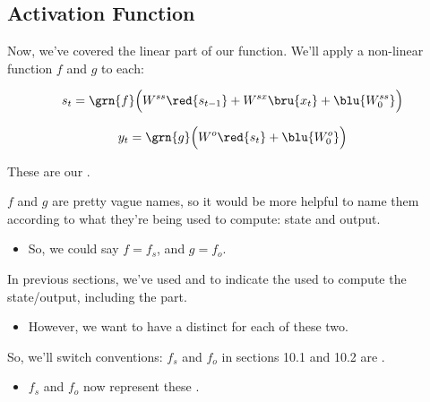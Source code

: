     \subsection{Activation Function}

        Now, we've covered the linear part of our function. We'll apply a non-linear function $f$ and $g$ to each:

        \begin{equation}
            s_t = \grn{f} \Big( W^{ss}\red{s_{t-1}} + W^{sx}\bru{x_t} + \blu{W^{ss}_0} \Big)
        \end{equation}

        \begin{equation}
            y_t = \grn{g} \Big( W^o\red{s_t} + \blu{W^o_0} \Big)
        \end{equation}

        These are our .

        $f$ and $g$ are pretty vague names, so it would be more helpful to name them according to what they're being used to compute: state and output.

        \begin{itemize}
            \item So, we could say $f=f_s$, and $g=f_o$.\\
        \end{itemize}

        \begin{clarification}
            In previous sections, we've used  and  to indicate the  used to compute the state/output, including the  part.

            \begin{itemize}
                \item However, we want to have a distinct  for each of these two.
            \end{itemize}

            \subsecdiv

            So, we'll switch conventions: $f_s$ and $f_o$ in sections 10.1 and 10.2 are .

            \begin{itemize}
                \item $f_s$ and $f_o$ now represent these .
             \end{itemize}
        \end{clarification}


